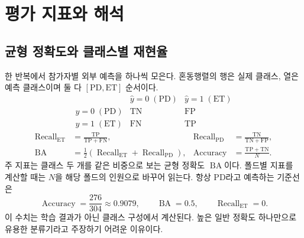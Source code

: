 \documentclass[11pt,a4paper]{article}
\newcommand{\PD}{\mathrm{PD}}
\newcommand{\ET}{\mathrm{ET}}
\DeclareMathOperator{\BA}{BA}
\numberwithin{equation}{section}
\begin{document}
\section{평가 지표와 해석}
\subsection{균형 정확도와 클래스별 재현율}
한 반복에서 참가자별 외부 예측을 하나씩 모은다.
혼동행렬의 행은 실제 클래스, 열은 예측 클래스이며 둘 다 \([\PD,\ET]\) 순서이다.
\begin{equation}
 \begin{array}{c|cc}
 &\widehat y=0\;(\PD)&\widehat y=1\;(\ET)\\ \hline
 y=0\;(\PD)&\mathrm{TN}&\mathrm{FP}\\
 y=1\;(\ET)&\mathrm{FN}&\mathrm{TP}
 \end{array}
\end{equation}
\begin{align}
 \operatorname{Recall}_{\ET}&=\frac{\mathrm{TP}}{\mathrm{TP}+\mathrm{FN}},&
 \operatorname{Recall}_{\PD}&=\frac{\mathrm{TN}}{\mathrm{TN}+\mathrm{FP}},\\
 \BA&=\tfrac12(\operatorname{Recall}_{\ET}+\operatorname{Recall}_{\PD}),&
 \operatorname{Accuracy}&=\frac{\mathrm{TP}+\mathrm{TN}}N.
\end{align}
주 지표는 클래스 두 개를 같은 비중으로 보는 균형 정확도 \(\BA\)이다.
폴드별 지표를 계산할 때는 \(N\)을 해당 폴드의 인원으로 바꾸어 읽는다.
항상 PD라고 예측하는 기준선은
\begin{equation}
 \operatorname{Accuracy}=\frac{276}{304}\approx0.9079,\qquad
 \BA=0.5,\qquad \operatorname{Recall}_{\ET}=0.
\end{equation}
이 수치는 학습 결과가 아닌 클래스 구성에서 계산된다.
높은 일반 정확도 하나만으로 유용한 분류기라고 주장하기 어려운 이유이다.
\end{document}
